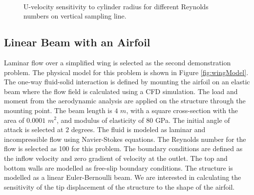 \documentclass[12pt]{aiaa-pretty}
\begin{document}
\begin{figure}[H]
{	}
	\quad
	\\
	\quad
	\caption{U-velocity sensitivity to cylinder radius for different Reynolds numbers on vertical sampling line.}
	\label{fig:cylinderVelocitySensitivity}
\end{figure}
%

\subsection{Linear Beam with an Airfoil}
Laminar flow over a simplified wing is selected as the second demonstration problem. The physical model for this problem is shown in Figure \ref{fig:wingModel}. The one-way fluid-solid interaction is defined by mounting the airfoil on an elastic beam where the flow field is calculated using a CFD simulation. The load and moment from the aerodynamic analysis are applied on the structure through the mounting point. The beam length is $4$ $m$, with a square cross-section with the area of $0.0001$ $m^2$, and modulus of elasticity of $80$ GPa. The initial angle of attack is selected at $2$ degrees. The fluid is modeled as laminar and incompressible flow using Navier-Stokes equations. The Reynolds number for the flow is selected as 100 for this problem. The boundary conditions are defined as the inflow velocity and zero gradient of velocity at the outlet. The top and bottom walls are modelled as free-slip boundary conditions. The structure is modelled as a linear Euler-Bernoulli beam. We are interested in calculating the sensitivity of the tip displacement of the structure to the shape of the airfoil.
\end{document}
